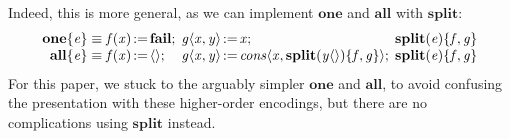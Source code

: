 \documentclass[acmsmall]{acmart}
\newcommand{\Varid}[1]{\mathit{#1}}
\begin{document}
Indeed, this is more general, as we can implement \ensuremath{\textbf{one}} and \ensuremath{\textbf{all}} with \ensuremath{\textbf{split}}:
\[\begin{array}{r@{\;}l@{\;}l@{\;}l}
    \ensuremath{\textbf{one}\{\Varid{e}\}} & \equiv \ensuremath{\Varid{f}(\Varid{x})\hspace{-0.14em}:=\hspace{-0.14em}\textbf{fail};\,} & \ensuremath{\Varid{g}\langle\Varid{x},\Varid{y}\rangle\hspace{-0.14em}:=\hspace{-0.14em}\Varid{x};\,} & \ensuremath{\textbf{split}(\Varid{e})\{\Varid{f},\Varid{g}\}} \\
    \ensuremath{\textbf{all}\{\Varid{e}\}} & \equiv \ensuremath{\Varid{f}(\Varid{x})\hspace{-0.14em}:=\hspace{-0.14em}\langle\rangle;\,}    & \ensuremath{\Varid{g}\langle\Varid{x},\Varid{y}\rangle\hspace{-0.14em}:=\hspace{-0.14em}\Varid{cons}\langle\Varid{x},\textbf{split}(\Varid{y}\langle\rangle)\{\Varid{f},\Varid{g}\}\rangle;\,} & \ensuremath{\textbf{split}(\Varid{e})\{\Varid{f},\Varid{g}\}}
\end{array}\]
For this paper, we stuck to the arguably simpler \ensuremath{\textbf{one}} and \ensuremath{\textbf{all}},
to avoid confusing the presentation with these higher-order encodings, but there are no complications using \ensuremath{\textbf{split}} instead.
\end{document}
